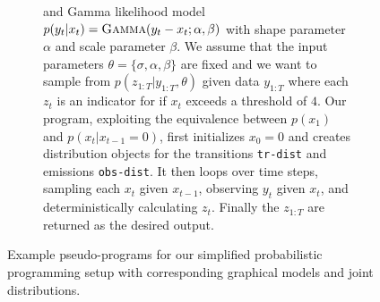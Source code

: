 \begin{figure}[p]
\begin{subfigure}[t]{\textwidth}
{				and Gamma likelihood model $p(y_t | x_t) = \textsc{Gamma}(y_t-x_t ; \alpha, \beta)$ with
				shape parameter $\alpha$ and scale parameter $\beta$.  We assume that the input
				parameters $\theta = \{\sigma,\alpha,\beta\}$ are fixed and we want
				to sample from $p(z_{1:T} | y_{1:T}, \theta)$ given data $y_{1:T}$ where each 
				$z_t$ is an indicator for if $x_{t}$ exceeds a threshold of $4$. Our program, exploiting the
				equivalence between $p(x_1)$ and $p(x_t|x_{t-1}=0)$, first initializes $x_0=0$ and creates
				distribution objects for the transitions \lstinline$tr-dist$\xspace and emissions
				\lstinline$obs-dist$\xspace.  It then loops over time steps, sampling each $x_t$ given
				$x_{t-1}$, observing $y_t$ given $x_t$, and deterministically calculating $z_t$.  Finally
				the $z_{1:T}$ are returned as the desired output.
				\label{fig:probprog:LGSSM}
				}
		\end{subfigure}
\caption{Example pseudo-programs for our simplified probabilistic programming setup with
	corresponding graphical models and joint distributions.\label{fig:probprog:example-progs}}
\end{figure}

